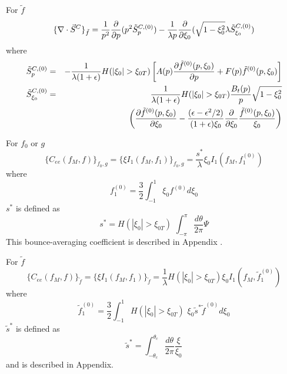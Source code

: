 For $\tilde{f}$ 
\[
\{\nabla \cdot \vec{S}^{C}\}_{\tilde{f}}=\frac{1}{p^{2}}\frac{\partial }{%
\partial p}(p^{2}\tilde{S}_{p}^{C,(0)})-\frac{1}{\lambda p}\frac{\partial }{%
\partial \xi _{0}}(\sqrt{1-\xi _{0}^{2}}\lambda \tilde{S}_{\xi _{0}}^{C,(0)})
\]
where 
\begin{eqnarray*}
\tilde{S}_{p}^{C,(0)} &=&-\frac{1}{\lambda (1+\epsilon )}H(|\xi _{0}|>\xi
_{0T})\left[ A(p)\frac{\partial \tilde{f}^{(0)}(p,\xi _{0})}{\partial p}+F(p)%
\tilde{f}^{(0)}(p,\xi _{0})\right]  \\
\tilde{S}_{\xi _{0}}^{C,(0)} &=&\frac{1}{\lambda (1+\epsilon )}H(|\xi
_{0}|>\xi _{0T})\frac{B_{t}(p)}{p}\sqrt{1-\xi _{0}^{2}} \\
&&\qquad \left( \frac{\partial \tilde{f}^{(0)}(p,\xi _{0})}{\partial \xi _{0}%
}-\frac{(\epsilon -\epsilon ^{2}/2)}{(1+\epsilon )\xi _{0}}\frac{\partial }{%
\partial \xi _{0}}\frac{\tilde{f}^{(0)}(p,\xi _{0})}{\xi _{0}}\right) 
\end{eqnarray*}

For $f_{0}$ or $g$ 
\[
\{C_{ee}(f_{M},f)\}_{f_{0},g}=\{\xi I_{1}(f_{M},f_{1})\}_{f_{0},g}=\frac{
s^{*}}{\lambda }\xi _{0}I_{1}(f_{M},f_{1}^{(0)})
\]
where 
\[
f_{1}^{(0)}=\frac{3}{2}\int_{-1}^{1}\xi _{0}f^{(0)}d\xi _{0}
\]
$s^{*}$ is defined as 
\[
s^{*}=H(|\xi _{0}|>\xi _{0T})\,\,\int_{-\pi }^{\pi }\frac{d\theta }{2\pi }
\Psi 
\]
This bounce-averaging coefficient is described in Appendix .

For $\tilde{f}$ 
\[
\{C_{ee}(f_{M},f)\}_{\tilde{f}}=\{\xi I_{1}(f_{M},f_{1})\}_{\tilde{f}}=\frac{
1}{\lambda }H(|\xi _{0}|>\xi _{0T})\xi _{0}I_{1}(f_{M},\tilde{f}_{1}^{(0)})
\]
where 
\[
\tilde{f}_{1}^{(0)}=\frac{3}{2}\int_{-1}^{1}H(|\xi _{0}|>\xi _{0T})\,\,\xi
_{0}\tilde{s}^{*}\tilde{f}^{(0)}d\xi _{0}
\]
$\tilde{s}^{*}$ is defined as 
\[
\tilde{s}^{*}=\int_{-\theta _{c}}^{\theta _{c}}\frac{d\theta }{2\pi }\frac{
\xi }{\xi _{0}}
\]
and is described in Appendix.
